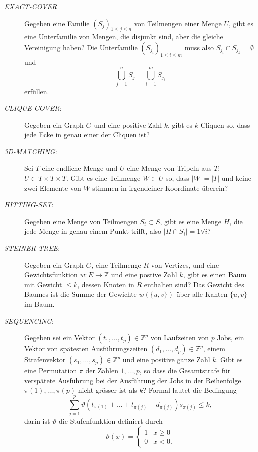 \begin{description}
\item[\textsl{EXACT-COVER}] Gegeben eine Familie $(S_j)_{1\le j\le n}$
von Teilmengen
einer Menge $U$, gibt es eine Unterfamilie von Mengen, die disjunkt sind,
aber die gleiche Vereinigung haben?
Die Unterfamilie $(S_{j_i})_{1\le i\le m}$ muss also
$S_{j_i}\cap S_{j_k}=\emptyset$ und 
\[
\bigcup_{j=1}^n S_j=\bigcup_{i=1}^mS_{j_i}
\]
erfüllen.
%
\item[\textsl{CLIQUE-COVER}:] Gegeben ein Graph $G$ und eine positive Zahl
$k$, gibt es $k$ Cliquen so, dass jede Ecke in genau einer der Cliquen ist?
%
\item[\textsl{3D-MATCHING}:] Sei $T$ eine endliche Menge und $U$ eine 
Menge von Tripeln aus $T$: $U\subset T\times T\times T$.
Gibt es eine
Teilmenge $W\subset U$ so, dass $|W|=|T|$ und keine zwei Elemente
von $W$ stimmen in irgendeiner Koordinate überein?
%
\item[\textsl{HITTING-SET}:] Gegeben eine Menge von Teilmengen $S_i\subset S$,
gibt es eine Menge $H$, die jede Menge in genau einem Punkt trifft, also
$|H\cap S_i|=1\forall i$?
%
\item[\textsl{STEINER-TREE}:]
Gegeben ein Graph $G$, eine Teilmenge $R$ von Vertizes, und eine
Gewichtsfunktion $w\colon E\to\mathbb Z$ und eine postive Zahl $k$, gibt es
einen Baum mit Gewicht $\le k$, dessen Knoten in $R$ enthalten sind?
Das Gewicht des Baumes ist die Summe der Gewichte 
$w(\{u,v\})$ über alle Kanten $\{u,v\}$ im Baum.
%
\item[\textsl{SEQUENCING}:] Gegeben sei ein Vektor
$(t_1,\dots,t_p)\in\mathbb Z^p$
von Laufzeiten von $p$ Jobs, ein Vektor von spätesten Ausführungszeiten 
$(d_1,\dots,d_p)\in\mathbb Z^p$, einem Strafenvektor 
$(s_1,\dots,s_p)\in\mathbb Z^p$ und eine positive ganze Zahl $k$.
Gibt es eine Permutation $\pi$ der Zahlen $1,\dots,p$, so dass
die Gesamtstrafe für verspätete Ausführung bei der Ausführung der Jobs
in der Reihenfolge $\pi(1),\dots,\pi(p)$ nicht grösser ist als $k$? 
Formal lautet die Bedingung
\[
\sum_{j=1}^p
\vartheta(t_{\pi(1)} +\dots +t_{\pi(j)} - d_{\pi(j)}) s_{\pi(j)} \le k,
\]
darin ist $\vartheta$ die Stufenfunktion definiert durch
\[
\vartheta(x)=\begin{cases}
1&x\ge 0\\
0&x<0.
\end{cases}
\]
\end{description}
